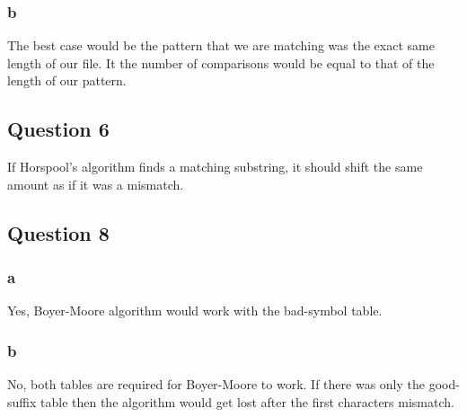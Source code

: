 \documentclass[12pt]{amsart}
\begin{document}
\subsubsection{b} The best case would be the pattern that we are matching was the exact same length of our file. It the number of comparisons would be equal to that of the length of our pattern.

\hfill\break
\subsection{Question 6}
\hfill\break
If Horspool's algorithm finds a matching substring, it should shift the same amount as if it was a mismatch. 
\hfill\break
\subsection{Question 8}
\hfill\break
\subsubsection{a}
Yes, Boyer-Moore algorithm would work with the bad-symbol table. \hfill\break
\subsubsection{b}
No, both tables are required for Boyer-Moore to work. If there was only the good-suffix table then the algorithm would get lost after the first characters mismatch.
\end{document}
